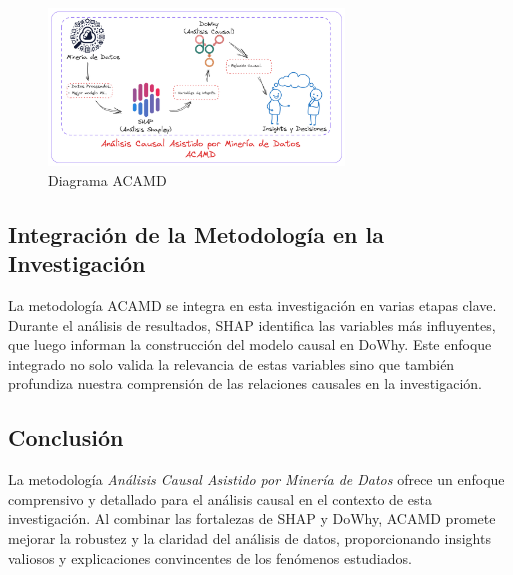 \begin{figure}[H]
    \centering
    \includegraphics[width=0.7\textwidth]{img/diagramas_Tesis_ACAMD-Propuesta-v2.png}
    \caption{Diagrama ACAMD}
    \label{fig:diagrama_ACAMD}
  \end{figure}

\subsection{Integración de la Metodología en la Investigación}\label{subsec:integracion-metodologia}

La metodología ACAMD se integra en esta investigación en varias etapas clave. Durante el análisis de resultados, SHAP identifica las variables más influyentes, que luego informan la construcción del modelo causal en DoWhy. Este enfoque integrado no solo valida la relevancia de estas variables sino que también profundiza nuestra comprensión de las relaciones causales en la investigación.

\subsection{Conclusión}\label{subsec:conclusion-metodologia}

La metodología \textit{Análisis Causal Asistido por Minería de Datos} ofrece un enfoque comprensivo y detallado para el análisis causal en el contexto de esta investigación. Al combinar las fortalezas de SHAP y DoWhy, ACAMD promete mejorar la robustez y la claridad del análisis de datos, proporcionando insights valiosos y explicaciones convincentes de los fenómenos estudiados.
